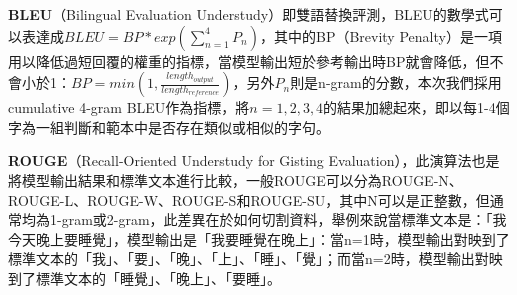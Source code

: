 \documentclass[8pt,a4paper,MingLiU,UTF8]{article}
\begin{document}
	\hspace*{0.1cm}%
	\begin{minipage}{.9\textwidth}%
		\textbf{BLEU}（Bilingual Evaluation Understudy）即雙語替換評測，BLEU的數學式可以表達成$BLEU=BP*exp(\sum_{n=1}^{4}P_n)$，其中的BP（Brevity Penalty）是一項用以降低過短回覆的權重的指標，當模型輸出短於參考輸出時BP就會降低，但不會小於1：$BP=min(1,\frac{length_{output}}{length_{reference}})$，另外$P_n$則是n-gram的分數，本次我們採用cumulative 4-gram BLEU作為指標，將$n=1,2,3,4$的結果加總起來，即以每1-4個字為一組判斷和範本中是否存在類似或相似的字句。\cite{papineni2002bleu}

		\textbf{ROUGE}（Recall-Oriented Understudy for Gisting Evaluation），此演算法也是將模型輸出結果和標準文本進行比較，一般ROUGE可以分為ROUGE-N、ROUGE-L、ROUGE-W、ROUGE-S和ROUGE-SU\cite{Lin2004LookingFA}，其中N可以是正整數，但通常均為1-gram或2-gram，此差異在於如何切割資料，舉例來說當標準文本是：「我今天晚上要睡覺」，模型輸出是「我要睡覺在晚上」：當n=1時，模型輸出對映到了標準文本的「我」、「要」、「晚」、「上」、「睡」、「覺」；而當n=2時，模型輸出對映到了標準文本的「睡覺」、「晚上」、「要睡」。


\end{minipage}
\end{document}
